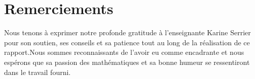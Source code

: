 \newpage

\section*{Remerciements}
Nous tenons à exprimer notre profonde gratitude à l’enseignante Karine Serrier pour son soutien, ses conseils et sa patience tout au long de la réalisation de ce rapport.Nous sommes reconnaissants de l’avoir eu comme encadrante et nous espérons que sa passion des mathématiques et sa bonne humeur se ressentiront dans le travail fourni.

